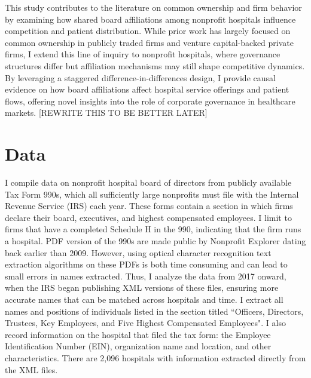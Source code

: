 \documentclass[12pt]{article}
\begin{document}
    This study contributes to the literature on common ownership and firm behavior by examining how shared board affiliations among nonprofit hospitals influence competition and patient distribution. While prior work has largely focused on common ownership in publicly traded firms and venture capital-backed private firms, I extend this line of inquiry to nonprofit hospitals, where governance structures differ but affiliation mechanisms may still shape competitive dynamics. By leveraging a staggered difference-in-differences design, I provide causal evidence on how board affiliations affect hospital service offerings and patient flows, offering novel insights into the role of corporate governance in healthcare markets. [REWRITE THIS TO BE BETTER LATER]

    \section{Data}\label{sec:data}

    
   I compile data on nonprofit hospital board of directors from publicly available Tax Form 990s, which all sufficiently large nonprofits must file with the Internal Revenue Service (IRS) each year. These forms contain a section in which firms declare their board, executives, and highest compensated employees. I limit to firms that have a completed Schedule H in the 990, indicating that the firm runs a hospital. PDF version of the 990s are made public by Nonprofit Explorer dating back earlier than 2009. However, using optical character recognition text extraction algorithms on these PDFs is both time consuming and can lead to small errors in names extracted. Thus, I analyze the data from 2017 onward, when the IRS began publishing XML versions of these files, ensuring more accurate names that can be matched across hospitals and time. I extract all names and positions of individuals listed in the section titled ``Officers, Directors, Trustees, Key Employees, and Five Highest Compensated Employees". I also record information on the hospital that filed the tax form: the Employee Identification Number (EIN), organization name and location, and other characteristics. There are 2,096 hospitals with information extracted directly from the XML files. 
\end{document}
